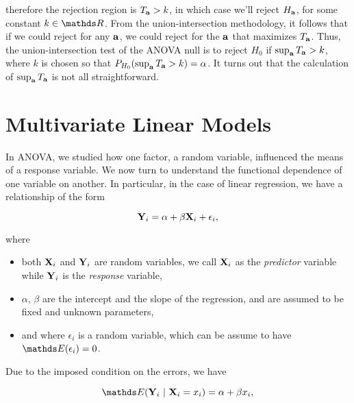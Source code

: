 \documentclass{homework}
\begin{document}
therefore the rejection region is $T_{\bf a} > k$, in which case we'll reject $H_{\bf a}$, for some constant $k \in \R$. From the union-intersection methodology, it follows that if we could reject for any ${\bf a}$, we could reject for the ${\bf a}$ that maximizes $T_{\bf a}$. Thus, the union-intersection test of the ANOVA null is to reject $H_0$ if $\sup_{\bf a} T_{\bf a} > k$, where $k$ is chosen so that $P_{H_0} (\sup_{\bf a} T_{\bf a} > k) = \alpha$. It turns out that the calculation of $\sup_{\bf a} T_{\bf a} $ is not all straightforward. \\

\clearpage

\section{Multivariate Linear Models}

In ANOVA, we studied how one factor, a random variable, influenced the means of a response variable. We now turn to understand the functional dependence of one variable on another. In particular, in the case of linear regression, we have a relationship of the form

\begin{equation}
{\bf Y}_i = \alpha + \beta {\bf X}_i + \epsilon_i,
\label{linear regression 1}
\end{equation}

where 

\begin{itemize}
    \item both ${\bf X}_i$ and ${\bf Y}_i$ are random variables, we call ${\bf X}_i$ as the \textit{predictor} variable while ${\bf Y}_i$ is the \textit{response} variable, 
    \item $\alpha$, $\beta$ are the intercept and the slope of the regression, and are assumed to be fixed and unknown parameters, 
    \item and where $\epsilon_i$ is a random variable, which can be assume to have $\E(\epsilon_i) = 0$. \\
\end{itemize}

Due to the imposed condition on the errors, we have 

\begin{equation}
\E ({\bf Y}_i\blank|\blank{\bf X}_i = x_i) = \alpha + \beta x_i,
\label{linear regression 2}
\end{equation}
\end{document}
